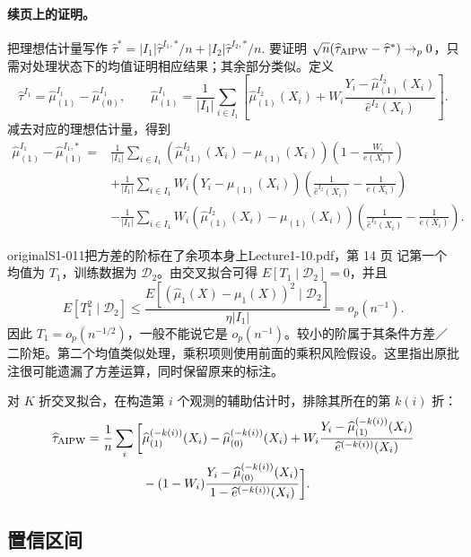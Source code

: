 \paragraph{续页上的证明。}
把理想估计量写作
$\widehat\tau^*=|I_1|\widehat\tau^{I_1,*}/n+|I_2|\widehat\tau^{I_2,*}/n$.
要证明 $\sqrt n(\widehat\tau_{\rm AIPW}-\widehat\tau^*)\to_p0$，只需对处理状态下的均值证明相应结果；其余部分类似。定义
\[
\widehat\tau^{I_1}=\widehat\mu^{I_1}_{(1)}-\widehat\mu^{I_1}_{(0)},\qquad
\widehat\mu^{I_1}_{(1)}=\frac1{|I_1|}\sum_{i\in I_1}
\left[\widehat\mu^{I_2}_{(1)}(X_i)+W_i\frac{Y_i-\widehat\mu^{I_2}_{(1)}(X_i)}{\widehat e^{I_2}(X_i)}\right].
\]
减去对应的理想估计量，得到
\begin{align*}
\widehat\mu^{I_1}_{(1)}-\widehat\mu^{I_1,*}_{(1)}
={}&\frac1{|I_1|}\sum_{i\in I_1}
(\widehat\mu^{I_2}_{(1)}(X_i)-\mu_{(1)}(X_i))\left(1-\frac{W_i}{e(X_i)}\right)\\
&+\frac1{|I_1|}\sum_{i\in I_1}W_i(Y_i-\mu_{(1)}(X_i))
\left(\frac1{\widehat e^{I_2}(X_i)}-\frac1{e(X_i)}\right)\\
&-\frac1{|I_1|}\sum_{i\in I_1}W_i(\widehat\mu^{I_2}_{(1)}(X_i)-\mu_{(1)}(X_i))
\left(\frac1{\widehat e^{I_2}(X_i)}-\frac1{e(X_i)}\right).
\end{align*}
\begin{reviewnote}{original}{S1-011}{把方差的阶标在了余项本身上}{Lecture1-10.pdf，第 14 页}
记第一个均值为 $T_1$，训练数据为 $\mathcal D_2$。由交叉拟合可得 $E[T_1\mid\mathcal D_2]=0$，并且
\[
E[T_1^2\mid\mathcal D_2]
\le \frac{E[(\widehat\mu_1(X)-\mu_1(X))^2\mid\mathcal D_2]}{\eta|I_1|}
=o_p(n^{-1}).
\]
因此 $T_1=o_p(n^{-1/2})$，一般不能说它是 $o_p(n^{-1})$。较小的阶属于其条件方差／二阶矩。第二个均值类似处理，乘积项则使用前面的乘积风险假设。这里指出原批注很可能遗漏了方差运算，同时保留原来的标注。
\end{reviewnote}


对 $K$ 折交叉拟合，在构造第 $i$ 个观测的辅助估计时，排除其所在的第 $k(i)$ 折：
\begin{align*}
\widehat\tau_{\rm AIPW}=\frac1n\sum_i\bigg[&\widehat\mu_{(1)}^{(-k(i))}(X_i)-\widehat\mu_{(0)}^{(-k(i))}(X_i)
+W_i\frac{Y_i-\widehat\mu_{(1)}^{(-k(i))}(X_i)}{\widehat e^{(-k(i))}(X_i)}\\
&-(1-W_i)\frac{Y_i-\widehat\mu_{(0)}^{(-k(i))}(X_i)}{1-\widehat e^{(-k(i))}(X_i)}\bigg].
\end{align*}
\subsection{置信区间}
